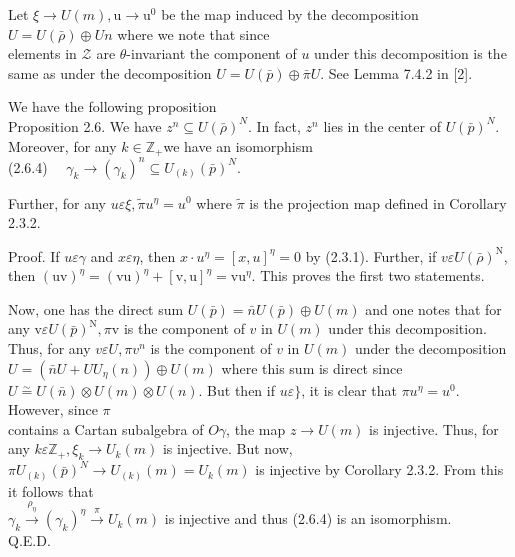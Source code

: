 \documentclass[10pt]{article}
\begin{document}
Let $\xi \rightarrow U(m), \mathrm{u} \rightarrow \mathrm{u}^{0}$ be the map induced by the decomposition $U=U(\bar{\rho}) \oplus U n$ where we note that since\\
elements in $\mathcal{Z}$ are $\theta$-invariant the component of $u$ under this decomposition is the same as under the decomposition $U=U(\bar{p}) \oplus \bar{\pi} U$. See Lemma 7.4.2 in [2].

We have the following proposition\\
Proposition 2.6. We have $z^{n} \subseteq U(\bar{\rho})^{N}$. In fact, $z^{n}$ lies in the center of $U(\bar{p})^{N}$. Moreover, for any $k \in \mathbb{Z}_{+}$we have an isomorphism\\
(2.6.4) $\quad \gamma_{k} \rightarrow\left(\gamma_{k}\right)^{n} \subseteq U_{(k)}(\bar{p})^{N}$.

Further, for any $u \varepsilon \xi, \tilde{\pi} u^{\eta}=u^{0}$ where $\tilde{\pi}$ is the projection map defined in Corollary 2.3.2.

Proof. If $u \varepsilon \gamma$ and $x \varepsilon \eta$, then $x \cdot u^{\eta}=[x, u]^{\eta}=0$ by (2.3.1). Further, if $v \varepsilon U(\bar{\rho})^{\mathrm{N}}$, then $(\mathrm{uv})^{\eta}=(\mathrm{vu})^{\eta}+[\mathrm{v}, \mathrm{u}]^{\eta}=\mathrm{v} \mathrm{u}^{\eta}$. This proves the first two statements.

Now, one has the direct sum $U(\bar{p})=\bar{n} U(\bar{p}) \oplus U(m)$ and one notes that for any $\mathrm{v} \varepsilon U(\bar{p})^{\mathrm{N}}, \pi \mathrm{v}$ is the component of $v$ in $U(m)$ under this decomposition. Thus, for any $v \varepsilon U, \pi v^{n}$ is the component of $v$ in $U(m)$ under the decomposition $U=\left(\bar{n} U+U U_{\eta}(n)\right) \oplus U(m)$ where this sum is direct since $U \stackrel{\sim}{=} U(\bar{n}) \otimes U(m) \otimes U(n)$. But then if $u \varepsilon\}$, it is clear that $\pi u^{\eta}=u^{0}$. However, since $\pi$\\
contains a Cartan subalgebra of $O \gamma$, the map $z \rightarrow U(m)$ is injective. Thus, for any $k \varepsilon \mathbb{Z}_{+}, \xi_{k} \rightarrow U_{k}(m)$ is injective. But now, $\pi U_{(k)}(\bar{p})^{N} \rightarrow U_{(k)}(m)=U_{k}(m)$ is injective by Corollary 2.3.2. From this it follows that\\
$\gamma_{k} \xrightarrow{\rho_{\eta}}\left(\gamma_{k}\right)^{\eta} \xrightarrow{\pi} U_{k}(m)$ is injective and thus (2.6.4) is an isomorphism.\\
Q.E.D.
\end{document}
